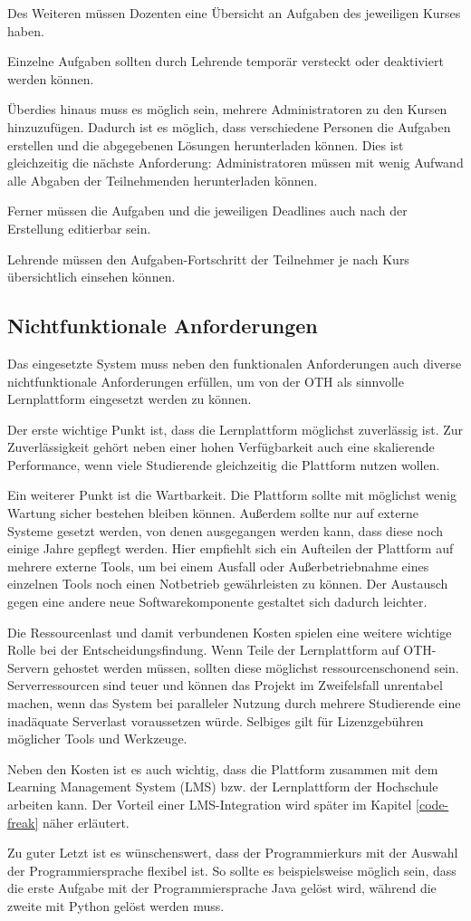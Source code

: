 Des Weiteren müssen Dozenten eine Übersicht an Aufgaben des jeweiligen Kurses
haben.

Einzelne Aufgaben sollten durch Lehrende temporär versteckt oder deaktiviert
werden können.

Überdies hinaus muss es möglich sein, mehrere Administratoren zu den Kursen
hinzuzufügen. Dadurch ist es möglich, dass verschiedene Personen die Aufgaben
erstellen und die abgegebenen Lösungen herunterladen können. Dies ist
gleichzeitig die nächste Anforderung: Administratoren müssen mit wenig
Aufwand alle Abgaben der Teilnehmenden herunterladen können.

Ferner müssen die Aufgaben und die jeweiligen Deadlines auch nach der Erstellung
editierbar sein.

Lehrende müssen den Aufgaben-Fortschritt der Teilnehmer je nach Kurs 
übersichtlich einsehen können.

\subsection{Nichtfunktionale Anforderungen}
\label{anforderungsanalyse-nichtfunktional}
Das eingesetzte System muss neben den funktionalen Anforderungen auch diverse
nichtfunktionale Anforderungen erfüllen, um von der OTH als sinnvolle
Lernplattform eingesetzt werden zu können.

Der erste wichtige Punkt ist, dass die Lernplattform möglichst zuverlässig ist.
Zur Zuverlässigkeit gehört neben einer hohen Verfügbarkeit auch eine skalierende
Performance, wenn viele Studierende gleichzeitig die Plattform nutzen wollen.

Ein weiterer Punkt ist die Wartbarkeit. Die Plattform sollte mit möglichst wenig
Wartung sicher bestehen bleiben können. Außerdem sollte nur auf externe Systeme
gesetzt werden, von denen ausgegangen werden kann, dass diese noch einige Jahre
gepflegt werden. Hier empfiehlt sich ein Aufteilen der Plattform auf mehrere
externe Tools, um bei einem Ausfall oder Außerbetriebnahme eines einzelnen Tools
noch einen Notbetrieb gewährleisten zu können. Der Austausch gegen eine andere
neue Softwarekomponente gestaltet sich dadurch leichter.

Die Ressourcenlast und damit verbundenen Kosten spielen eine weitere wichtige
Rolle bei der Entscheidungsfindung. Wenn Teile der Lernplattform auf OTH-Servern
gehostet werden müssen, sollten diese möglichst ressourcenschonend sein.
Serverressourcen sind teuer und können das Projekt im Zweifelsfall unrentabel
machen, wenn das System bei paralleler Nutzung durch mehrere Studierende eine
inadäquate Serverlast voraussetzen würde. Selbiges gilt für Lizenzgebühren
möglicher Tools und Werkzeuge.

Neben den Kosten ist es auch wichtig, dass die Plattform zusammen mit dem
Learning Management System (LMS) bzw. der Lernplattform der Hochschule arbeiten
kann. Der Vorteil einer LMS-Integration wird später im Kapitel
\ref{code-freak} näher erläutert.

Zu guter Letzt ist es wünschenswert, dass der Programmierkurs mit der Auswahl
der Programmiersprache flexibel ist. So sollte es beispielsweise möglich sein,
dass die erste Aufgabe mit der Programmiersprache Java gelöst wird,
während die zweite mit Python gelöst werden muss.